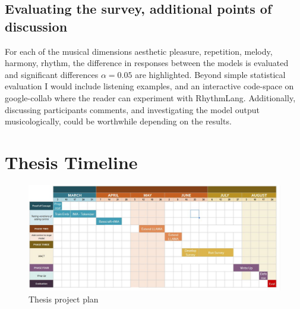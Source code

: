 \subsection{Evaluating the survey, additional points of discussion}
For each of the musical dimensions aesthetic pleasure, repetition, melody, harmony, rhythm, the difference in responses between the models is evaluated and significant differences $\alpha = 0.05$ are highlighted. 
Beyond simple statistical evaluation I would include listening examples, and an interactive code-space on google-collab where the reader can experiment with RhythmLang. Additionally, discussing participants comments, and investigating the model output musicologically, could be worthwhile depending on the results. 

\section{Thesis Timeline}

\begin{figure}[H]
    \centering
    \includegraphics[width=1\textwidth]{IMAGES/project_plan.jpg} 
    \caption{Thesis project plan}
    \label{fig:projectplan}
\end{figure}



